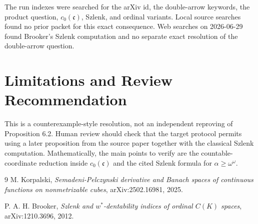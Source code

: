 \documentclass[11pt]{article}
\newcommand{\ccard}{\mathfrak c}
\begin{document}
The run indexes were searched for the arXiv id, the double-arrow keywords, the
product question, $c_0(\ccard)$, Szlenk, and ordinal variants. Local source
searches found no prior packet for this exact consequence. Web searches on
2026-06-29 found Brooker's Szlenk computation and no separate exact resolution
of the double-arrow question.

\section{Limitations and Review Recommendation}

This is a counterexample-style resolution, not an independent reproving of
Proposition 6.2. Human review should check that the target protocol permits
using a later proposition from the source paper together with the classical
Szlenk computation. Mathematically, the main points to verify are the
countable-coordinate reduction inside $c_0(\ccard)$ and the cited Szlenk
formula for $\alpha\geq\omega^\omega$.

\begin{thebibliography}{9}
M. Korpalski,
\emph{Semadeni-Pelczynski derivative and Banach spaces of continuous functions
on nonmetrizable cubes},
arXiv:2502.16981, 2025.

P. A. H. Brooker,
\emph{Szlenk and $w^\ast$-dentability indices of ordinal $C(K)$ spaces},
arXiv:1210.3696, 2012.
\end{thebibliography}
\end{document}
